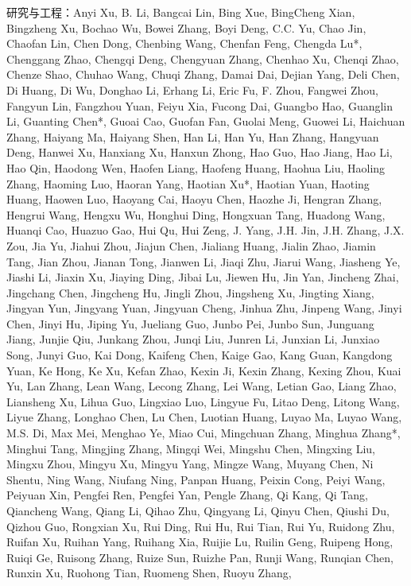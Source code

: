 \documentclass[
  10
]{article}
\begin{document}
研究与工程：Anyi Xu, B. Li, Bangcai Lin, Bing Xue,
BingCheng Xian, Bingzheng Xu, Bochao Wu, Bowei Zhang, Boyi Deng, C.C.
Yu, Chao Jin, Chaofan Lin, Chen Dong, Chenbing Wang, Chenfan Feng,
Chengda Lu*, Chenggang Zhao, Chengqi Deng, Chengyuan Zhang, Chenhao Xu,
Chenqi Zhao, Chenze Shao, Chuhao Wang, Chuqi Zhang, Damai Dai, Dejian
Yang, Deli Chen, Di Huang, Di Wu, Donghao Li, Erhang Li, Eric Fu, F.
Zhou, Fangwei Zhou, Fangyun Lin, Fangzhou Yuan, Feiyu Xia, Fucong Dai,
Guangbo Hao, Guanglin Li, Guanting Chen*, Guoai Cao, Guofan Fan, Guolai
Meng, Guowei Li, Haichuan Zhang, Haiyang Ma, Haiyang Shen, Han Li, Han
Yu, Han Zhang, Hangyuan Deng, Hanwei Xu, Hanxiang Xu, Hanxun Zhong, Hao
Guo, Hao Jiang, Hao Li, Hao Qin, Haodong Wen, Haofen Liang, Haofeng
Huang, Haohua Liu, Haoling Zhang, Haoming Luo, Haoran Yang, Haotian Xu*,
Haotian Yuan, Haoting Huang, Haowen Luo, Haoyang Cai, Haoyu Chen, Haozhe
Ji, Hengran Zhang, Hengrui Wang, Hengxu Wu, Honghui Ding, Hongxuan Tang,
Huadong Wang, Huanqi Cao, Huazuo Gao, Hui Qu, Hui Zeng, J. Yang, J.H.
Jin, J.H. Zhang, J.X. Zou, Jia Yu, Jiahui Zhou, Jiajun Chen, Jialiang
Huang, Jialin Zhao, Jiamin Tang, Jian Zhou, Jianan Tong, Jianwen Li,
Jiaqi Zhu, Jiarui Wang, Jiasheng Ye, Jiashi Li, Jiaxin Xu, Jiaying Ding,
Jibai Lu, Jiewen Hu, Jin Yan, Jincheng Zhai, Jingchang Chen, Jingcheng
Hu, Jingli Zhou, Jingsheng Xu, Jingting Xiang, Jingyan Yun, Jingyang
Yuan, Jingyuan Cheng, Jinhua Zhu, Jinpeng Wang, Jinyi Chen, Jinyi Hu,
Jiping Yu, Jueliang Guo, Junbo Pei, Junbo Sun, Junguang Jiang, Junjie
Qiu, Junkang Zhou, Junqi Liu, Junren Li, Junxian Li, Junxiao Song, Junyi
Guo, Kai Dong, Kaifeng Chen, Kaige Gao, Kang Guan, Kangdong Yuan, Ke
Hong, Ke Xu, Kefan Zhao, Kexin Ji, Kexin Zhang, Kexing Zhou, Kuai Yu,
Lan Zhang, Lean Wang, Lecong Zhang, Lei Wang, Letian Gao, Liang Zhao,
Liansheng Xu, Lihua Guo, Lingxiao Luo, Lingyue Fu, Litao Deng, Litong
Wang, Liyue Zhang, Longhao Chen, Lu Chen, Luotian Huang, Luyao Ma, Luyao
Wang, M.S. Di, Max Mei, Menghao Ye, Miao Cui, Mingchuan Zhang, Minghua
Zhang*, Minghui Tang, Mingjing Zhang, Mingqi Wei, Mingshu Chen, Mingxing
Liu, Mingxu Zhou, Mingyu Xu, Mingyu Yang, Mingze Wang, Muyang Chen, Ni
Shentu, Ning Wang, Niufang Ning, Panpan Huang, Peixin Cong, Peiyi Wang,
Peiyuan Xin, Pengfei Ren, Pengfei Yan, Pengle Zhang, Qi Kang, Qi Tang,
Qiancheng Wang, Qiang Li, Qihao Zhu, Qingyang Li, Qinyu Chen, Qiushi Du,
Qizhou Guo, Rongxian Xu, Rui Ding, Rui Hu, Rui Tian, Rui Yu, Ruidong
Zhu, Ruifan Xu, Ruihan Yang, Ruihang Xia, Ruijie Lu, Ruilin Geng,
Ruipeng Hong, Ruiqi Ge, Ruisong Zhang, Ruize Sun, Ruizhe Pan, Runji
Wang, Runqian Chen, Runxin Xu, Ruohong Tian, Ruomeng Shen, Ruoyu Zhang,
\end{document}
